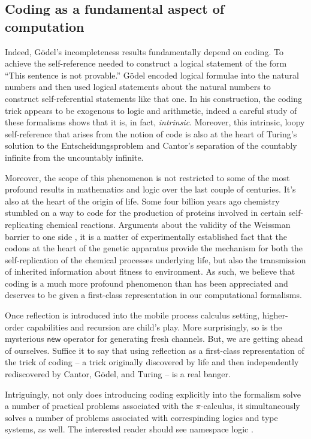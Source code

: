 \subsection{Coding as a fundamental aspect of computation}

Indeed, G\"odel's incompleteness results fundamentally depend on
coding. To achieve the self-reference needed to construct a logical
statement of the form ``This sentence is not provable.'' G\"odel
encoded logical formulae into the natural numbers and then used
logical statements about the natural numbers to construct
self-referential statements like that one. In his construction, the
coding trick appears to be exogenous to logic and arithmetic, indeed a
careful study of these formalisms shows that it is, in fact,
\emph{intrinsic}. Moreover, this intrinsic, loopy self-reference that
arises from the notion of code is also at the heart of Turing's
solution to the Entscheidungsproblem and Cantor's separation of the
countably infinite from the uncountably infinite.

Moreover, the scope of this phenomenon is not restricted to some of
the most profound results in mathematics and logic over the last
couple of centuries. It's also at the heart of the origin of
life. Some four billion years ago chemistry stumbled on a way to code
for the production of proteins involved in certain self-replicating
chemical reactions. Arguments about the validity of the Weissman
barrier to one side \cite{William2018TheGA}, it is a matter of
experimentally established fact that the codons at the heart of the
genetic apparatus provide the mechanism for both the self-replication
of the chemical processes underlying life, but also the transmission
of inherited information about fitness to environment. As such, we
believe that coding is a much more profound phenomenon than has been
appreciated and deserves to be given a first-class representation in
our computational formalisms.

Once reflection is introduced into the mobile process calculus
setting, higher-order capabilities and recursion are child's
play. More surprisingly, so is the mysterious $\mathsf{new}$ operator
for generating fresh channels. But, we are getting ahead of
ourselves. Suffice it to say that using reflection as a first-class
representation of the trick of coding -- a trick originally discovered
by life and then independently rediscovered by Cantor, G\"odel, and
Turing -- is a real banger.

Intriguingly, not only does introducing coding explicitly into the
formalism solve a number of practical problems associated with the
$\pi$-calculus, it simultaneously solves a number of problems
associated with correspinding logics and type systems, as well. The
interested reader should see namespace logic
\cite{DBLP:conf/tgc/MeredithR05}.


